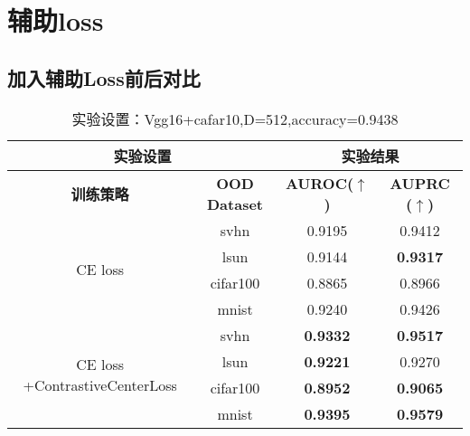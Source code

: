 \documentclass{article}
\begin{document}
\section{辅助loss}
\subsection{加入辅助Loss前后对比}
\begin{table}[H]
	\captionsetup{labelformat=empty}
	\centering
	\renewcommand{\arraystretch}{1.2} %
	\setlength{\tabcolsep}{8pt} %
	\begin{tabular}{|c|c|c|c|}
		\hline
		\multicolumn{2}{|c|}{\textbf{实验设置}} & \multicolumn{2}{c|}{\textbf{实验结果}} \\ 
		\hline
		\textbf{训练策略} & \textbf{OOD Dataset} & \textbf{ AUROC($\uparrow$)} & \textbf{ AUPRC ($\uparrow$)} \\ 
		\hline
		\multirow{4}{*}{CE loss} 
		& svhn      & 0.9195 & 0.9412 \\ 
		& lsun      & 0.9144 & \textbf{ 0.9317} \\ 
		& cifar100  & 0.8865 & 0.8966 \\ 
		& mnist     & 0.9240 & 0.9426 \\ 
		\hline
		\multirow{4}{*}{CE loss +ContrastiveCenterLoss}
		& svhn      & \textbf{ 0.9332} & \textbf{0.9517} \\ 
		& lsun      & \textbf{ 0.9221} & 0.9270 \\ 
		& cifar100  & \textbf{ 0.8952} & \textbf{0.9065} \\ 
		& mnist     & \textbf{0.9395} & \textbf{0.9579} \\ 
		\hline
	\end{tabular}
	\caption{实验设置：Vgg16+cafar10,D=512,accuracy=0.9438}
\end{table}
\end{document}
